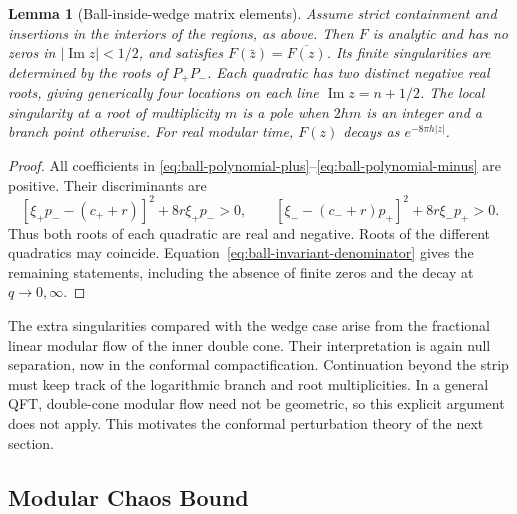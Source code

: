 \documentclass[a4paper,11pt]{article}
\newtheorem{lemma}[theorem]{Lemma}
\theoremstyle{definition}
\begin{document}
\begin{lemma}[Ball-inside-wedge matrix elements]
\label{lem:ball-matrix-element}
Assume strict containment and insertions in the interiors of the regions, as above. Then $F$ is analytic and has no zeros in $|\operatorname{Im}z|<1/2$, and satisfies $F(\bar z)=\overline{F(z)}$. Its finite singularities are determined by the roots of $P_+P_-$. Each quadratic has two distinct negative real roots, giving generically four locations on each line $\operatorname{Im}z=n+1/2$. The local singularity at a root of multiplicity $m$ is a pole when $2hm$ is an integer and a branch point otherwise. For real modular time, $F(z)$ decays as $e^{-8\pi h|z|}$.
\end{lemma}
\begin{proof}
All coefficients in \eqref{eq:ball-polynomial-plus}--\eqref{eq:ball-polynomial-minus} are positive. Their discriminants are
\[
 [\xi_+p_--(c_++r)]^2+8r\xi_+p_->0,
 \qquad
 [\xi_--(c_-+r)p_+]^2+8r\xi_-p_+>0.
\]
Thus both roots of each quadratic are real and negative. Roots of the different quadratics may coincide. Equation~\eqref{eq:ball-invariant-denominator} gives the remaining statements, including the absence of finite zeros and the decay at $q\to0,\infty$.
\end{proof}

The extra singularities compared with the wedge case arise from the fractional linear modular flow of the inner double cone. Their interpretation is again null separation, now in the conformal compactification. Continuation beyond the strip must keep track of the logarithmic branch and root multiplicities. In a general QFT, double-cone modular flow need not be geometric, so this explicit argument does not apply. This motivates the conformal perturbation theory of the next section.

\subsection{Modular Chaos Bound}
\label{subsec:modular-chaos-bound}
\end{document}
